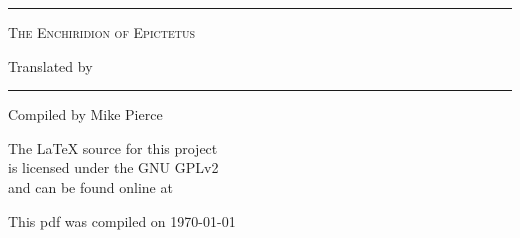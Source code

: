 



\begin{titlepage}
\begin{center}

    \vspace*{\baselineskip}
    \noindent
        \rule{\textwidth}{1pt}

    \noindent
        \textsc{\LARGE{The Enchiridion of Epictetus}}

    \noindent
        Translated by \AuthorFull

    \noindent
        \rule{\textwidth}{1pt}

    \vfill

    \noindent
        \footnotesize{%
            Compiled by Mike Pierce \\%
            \email{} %
        }

    \vspace*{.5in}\noindent
        \footnotesize{%
            The \LaTeX{} source for this project \\%
            is licensed under the GNU GPLv2 \\%
            and can be found online at \\%
            \github{} %
        }

    \vspace*{1in}\noindent
        \tiny{%
            This pdf was compiled on \dmy\today %
        }

\end{center}
\end{titlepage}




